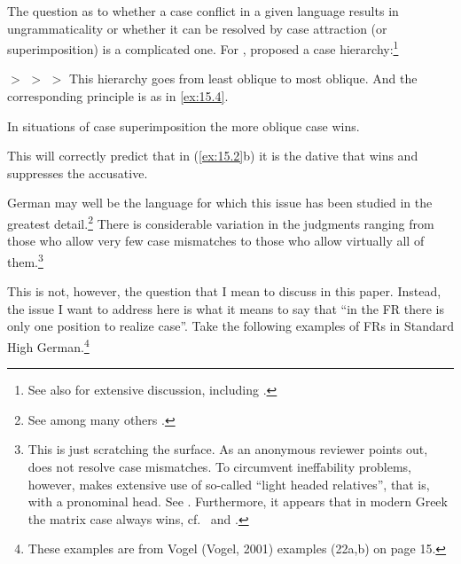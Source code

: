 \documentclass[output=paper]{langsci/langscibook}
\begin{document}
\begin{refcontext}
The question as to whether a case conflict in a given language results in
ungrammaticality or whether it can be resolved by case attraction (or
superimposition) is a complicated one. For ,
\textcite{Hirschbuhler1976} proposed a case hierarchy:\footnote{See also
    \citet{Harbert1983} for extensive discussion, including .}

\ea\label{ex:15.3}
    \Nom{} $>$ \Acc{} $>$ \Dat{} $>$ \Gen{}
\z
This hierarchy goes from least oblique to most oblique. And the corresponding
principle is as in \eqref{ex:15.4}.

\ea\label{ex:15.4}
    In situations of case superimposition the more oblique case wins.
\z

This will  correctly predict that in (\ref{ex:15.2}b) it is the dative that wins and
suppresses the accusative.

German may well be the language for which this issue has been studied in the
greatest detail.\footnote{See among many others \citet{Vogel2001}.} There is
considerable variation in the judgments ranging from those who allow very few
case mismatches to those who allow virtually all of them.\footnote{This is just
    scratching the surface. As an anonymous reviewer points out,  does
    not resolve case mismatches. To circumvent ineffability problems, however,
     makes extensive use of so-called \enquote{light headed relatives},
    that is,  with a pronominal head. See \citet{Citko2004}.
Furthermore, it appears that in modern Greek the matrix case always wins, cf.\
\citet{Daskalaki2011} and \citet{Spyropoulos2007}.\label{fn:15.6}}

This is not, however, the question that I mean to discuss in this paper.
Instead, the issue I want to address here is what it means to say that “in the
FR there is only one position to realize case”. Take the following examples of
\glspl{FR} in Standard High German.\footnote{These examples are from Vogel (Vogel,
2001) examples (22a,b) on page 15.}


\end{refcontext}
\end{document}
